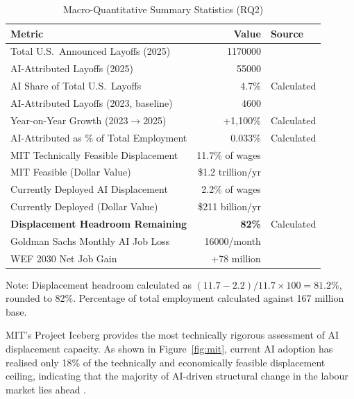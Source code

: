 \documentclass[12pt, a4paper]{article}
\begin{document}
\begin{table}[H]
\centering
\caption{Macro-Quantitative Summary Statistics (RQ2)}
\label{tab:macro}
\begin{threeparttable}
\begin{tabular}{@{}lrl@{}}
\toprule
\textbf{Metric} & \textbf{Value} & \textbf{Source} \\
\midrule
Total U.S.\ Announced Layoffs (2025)      & \num{1170000}  & \citet{challenger2025} \\
AI-Attributed Layoffs (2025)              & \num{55000}    & \citet{challenger2025} \\
AI Share of Total U.S.\ Layoffs           & 4.7\%         & Calculated \\
AI-Attributed Layoffs (2023, baseline)    & \num{4600}     & \citet{challenger2025} \\
Year-on-Year Growth (2023$\to$2025)       & +1,100\%      & Calculated \\
AI-Attributed as \% of Total Employment  & 0.033\%       & Calculated \\
MIT Technically Feasible Displacement     & 11.7\% of wages& \citet{mit2025} \\
MIT Feasible (Dollar Value)               & \$1.2 trillion/yr & \citet{mit2025} \\
Currently Deployed AI Displacement        & 2.2\% of wages & \citet{mit2025} \\
Currently Deployed (Dollar Value)         & \$211 billion/yr & \citet{mit2025} \\
\textbf{Displacement Headroom Remaining}  & \textbf{82\%} & Calculated \\
Goldman Sachs Monthly AI Job Loss         & \num{16000}/month & \citet{goldmansachs2025} \\
WEF 2030 Net Job Gain                     & +78 million   & \citet{wef2025} \\
\bottomrule
\end{tabular}
\begin{tablenotes}
\small\item Note: Displacement headroom calculated as $(11.7 - 2.2) / 11.7 \times 100 = 81.2\%$,
rounded to 82\%. Percentage of total employment calculated against 167 million base.
\end{tablenotes}
\end{threeparttable}
\end{table}

MIT's Project Iceberg provides the most technically rigorous assessment of AI displacement
capacity. As shown in Figure~\ref{fig:mit}, current AI adoption has realised only 18\% of
the technically and economically feasible displacement ceiling, indicating that the majority
of AI-driven structural change in the labour market lies ahead \citep{mit2025}.
\end{document}
